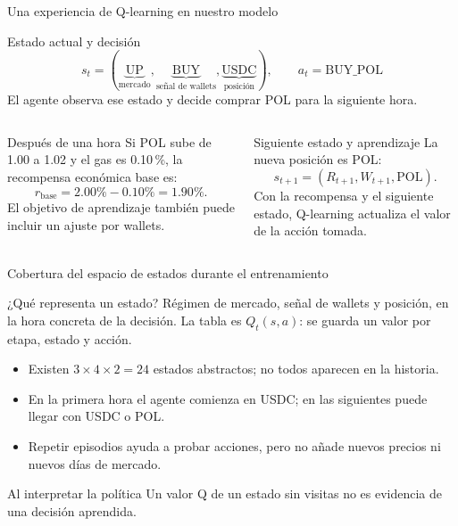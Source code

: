 \documentclass[10pt,aspectratio=169]{beamer}
\begin{document}
\begin{frame}{Una experiencia de Q-learning en nuestro modelo}
\small
\begin{block}{Estado actual y decisión}
\[
s_t=(\underbrace{\text{UP}}_{\text{mercado}},
     \underbrace{\text{BUY}}_{\text{señal de wallets}},
     \underbrace{\text{USDC}}_{\text{posición}}),
\qquad a_t=\text{BUY\_POL}
\]
El agente observa ese estado y decide comprar POL para la siguiente hora.
\end{block}
\begin{columns}[T,onlytextwidth]
\begin{block}{Después de una hora}
Si POL sube de 1.00 a 1.02 y el gas es 0.10\,\%, la recompensa económica base es:
\[
r_{\text{base}}=2.00\%-0.10\%=1.90\%.
\]
El objetivo de aprendizaje también puede incluir un ajuste por wallets.
\end{block}
\begin{block}{Siguiente estado y aprendizaje}
La nueva posición es POL:
\[
s_{t+1}=(R_{t+1},W_{t+1},\text{POL}).
\]
Con la recompensa y el siguiente estado, Q-learning actualiza el valor de la acción tomada.
\end{block}
\end{columns}
\end{frame}

\begin{frame}{Cobertura del espacio de estados durante el entrenamiento}
\begin{block}{¿Qué representa un estado?}
\small Régimen de mercado, señal de wallets y posición, en la hora concreta de la decisión.
La tabla es $Q_t(s,a)$: se guarda un valor por etapa, estado y acción.
\end{block}
\begin{itemize}
\item Existen $3\times4\times2=24$ estados abstractos; no todos aparecen en la historia.
\item En la primera hora el agente comienza en USDC; en las siguientes puede llegar con USDC o POL.
\item Repetir episodios ayuda a probar acciones, pero no añade nuevos precios ni nuevos días de mercado.
\end{itemize}
\centering\small \QTablaInicio
\begin{alertblock}{Al interpretar la política}
Un valor Q de un estado sin visitas no es evidencia de una decisión aprendida.
\end{alertblock}
\end{frame}
\end{document}
